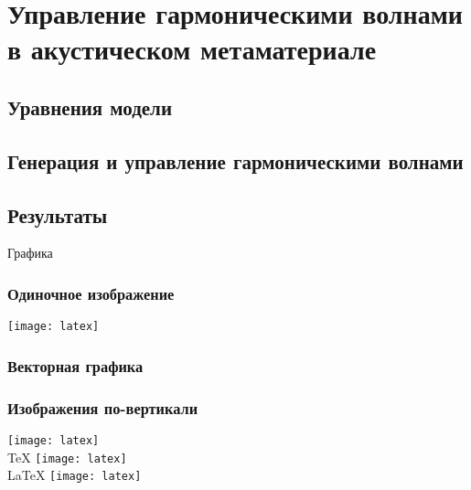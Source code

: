 \section{Управление гармоническими волнами в акустическом метаматериале}
\subsection{Уравнения модели}
\subsection{Генерация и управление гармоническими волнами}
\subsection{Результаты}
\begin{frame}
    \begin{center}
        \Huge
        Графика
    \end{center}
\end{frame}


\begin{frame}
    \frametitle{Одиночное изображение}
    \centering
    \texttt{[image: latex]} %
\end{frame}

\begin{frame}
    \frametitle{Векторная графика}
    \begin{figure}
        \centering
        
    \end{figure}
\end{frame}


\begin{frame}
    \frametitle{Изображения по-вертикали}
    \centering
    \vfill
    \texttt{[image: latex]} \\
    \TeX
    \vfill
    \texttt{[image: latex]} \\
    \LaTeX
    \vfill
    \texttt{[image: latex]} \\
    \vfill
\end{frame}


